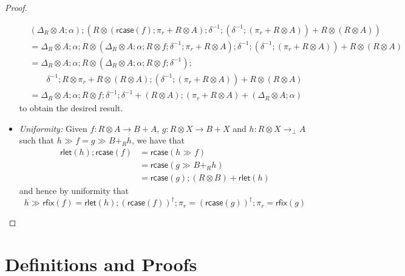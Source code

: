 \documentclass[acmsmall,screen,review]{acmart}
\newcommand{\ms}[1]{\ensuremath{\mathsf{#1}}}
\newcommand{\dmor}[1]{{\Delta}_{#1}}
\newcommand{\rlmor}[1]{\ms{rlet}(#1)}
\newcommand{\rcase}[1]{\ms{rcase}(#1)}
\newcommand{\rfix}[1]{\ms{rfix}(#1)}
\newcommand{\rseq}[3]{#2 \gg_{#1} #3}
\begin{document}
\begin{proof}
\begin{itemize}
    \begin{equation}
      \begin{aligned}
        & (\dmor{R} \otimes A ; \alpha )
          ; (
            R \otimes (\rcase{f} ; \pi_r + R \otimes A) ; \delta^{-1} 
              ; (\delta^{-1} ; (\pi_r + R \otimes A)) + R \otimes (R \otimes A)
          ) \\
        & = \dmor{R} \otimes A ; \alpha
          ; R \otimes (\dmor{R} \otimes A ; \alpha ; R \otimes f ; \delta^{-1} 
            ; \pi_r + R \otimes A) 
          ; \delta^{-1} ; (\delta^{-1} ; (\pi_r + R \otimes A)) + R \otimes (R \otimes A) \\
        & = \dmor{R} \otimes A ; \alpha
          ; R \otimes (\dmor{R} \otimes A ; \alpha ; R \otimes f ; \delta^{-1}) ; \\ & \qquad 
            \delta^{-1} ; R \otimes \pi_r + R \otimes (R \otimes A) 
          ; (\delta^{-1} ; (\pi_r + R \otimes A)) + R \otimes (R \otimes A) \\
        & = \dmor{R} \otimes A ; \alpha
          ; R \otimes f
          ; \delta^{-1}
          ; \delta^{-1} + (R \otimes A)
          ; (\pi_r + R \otimes A) + (\dmor{R} \otimes A ; \alpha)
      \end{aligned}
    \end{equation}
    to obtain the desired result.
    \item \emph{Uniformity:} 
    Given $f : R \otimes A \to B + A$, $g : R \otimes X \to B + X$ and $h : R \otimes X \to_\bot A$
    such that $\rseq{}{h}{f} = \rseq{}{g}{B +_R h}$, we have that
    \begin{equation}
      \begin{aligned}
      \rlmor{h} ; \rcase{f} 
      & = \rcase{\rseq{}{h}{f}} \\
      & = \rcase{\rseq{}{g}{B +_R h}} \\ 
      & = \rcase{g} ; (R \otimes B) + \rlmor{h}        
      \end{aligned}
    \end{equation}
    and hence by uniformity that
    \begin{equation}
      \rseq{}{h}{\rfix{f}} 
      = \rlmor{h} ; (\rcase{f})^\dagger ; \pi_r
      = (\rcase{g})^\dagger ; \pi_r 
      = \rfix{g}
    \end{equation}
  \end{itemize}
\end{proof}

\section{Definitions and Proofs}
\end{document}
